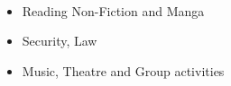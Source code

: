 \\[\lsep]

\begin{itemize}

	\itemsep-0.25em
	\item \noindent Reading Non-Fiction and Manga
	\item \noindent Security, Law
	\item \noindent Music, Theatre and Group activities

\end{itemize}
